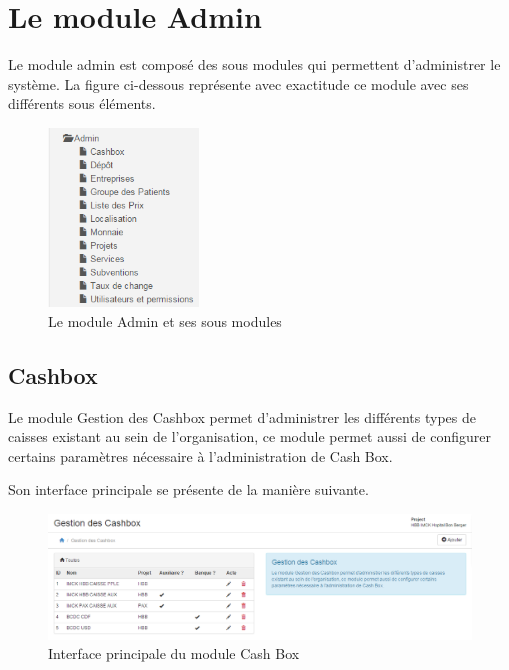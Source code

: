 \documentclass[12pt,a4paper]{report}
\begin{document}
\chapter{Le module Admin}        
Le module admin est composé des sous modules qui permettent d'administrer le système. La figure ci-dessous représente avec exactitude ce module avec ses différents sous éléments.
\begin{figure}[h]
\begin{center}
\includegraphics[width=4cm]{pic/s_admin.png}
\end{center}
\caption{Le module Admin et ses sous modules}
\label{Le module Admin et ses sous menus}
\end{figure} 

\newpage
\section{Cashbox}
Le module Gestion des Cashbox permet d'administrer les différents types de caisses existant au sein de l'organisation, ce module permet aussi de configurer certains paramètres nécessaire à l'administration de Cash Box.

Son interface principale se présente de la manière suivante.

\begin{figure}[h]
\begin{center}
\includegraphics[width=14cm]{pic/GestCashBox.png}
\end{center}
\caption{Interface principale du module Cash Box}
\label{Interface principale du module Cash Box}
\end{figure} 
\end{document}
